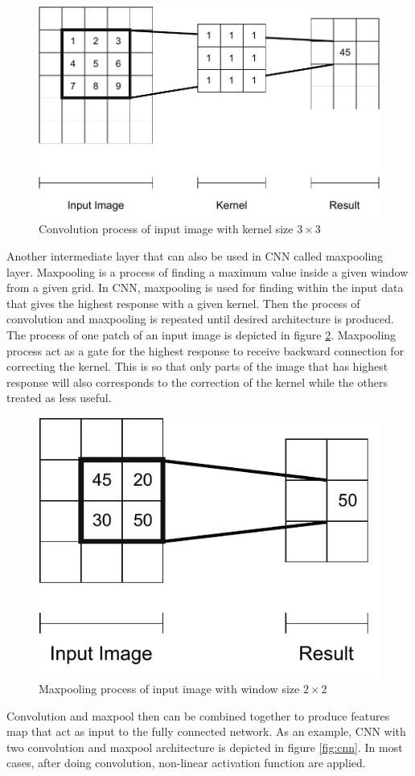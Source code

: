     \begin{figure}
        \centering
        \includegraphics[width=.6\linewidth]{images/convolution.pdf}
        \caption{Convolution process of input image with kernel size $3\times3$}
        \label{fig:convolution}
    \end{figure}
    
    Another intermediate layer that can also be used in CNN called
    maxpooling layer. Maxpooling is a process of finding a maximum
    value inside a given window from a given grid. In CNN, maxpooling
    is used for finding within the input data that gives the highest
    response with a given kernel. Then the process of convolution and
    maxpooling is repeated until desired architecture is produced. The
    process of one patch of an input image is depicted in figure
    \ref{fig:maxpool}. Maxpooling process act as a gate for the
    highest response to receive backward connection for correcting the
    kernel. This is so that only parts of the image that has highest
    response will also corresponds to the correction of the kernel
    while the others treated as less useful. 

    \begin{figure}
        \centering
        \includegraphics[width=.4\linewidth]{images/maxpool.pdf}
        \caption{Maxpooling process of input image with window size $2\times2$}
        \label{fig:maxpool}
    \end{figure}

    Convolution and maxpool then can be combined together to produce
    features map that act as input to the fully connected network. As
    an example, CNN with two convolution and maxpool architecture is
    depicted in figure \ref{fig:cnn}. In most cases, after doing
    convolution, non-linear activation function are applied.
    
